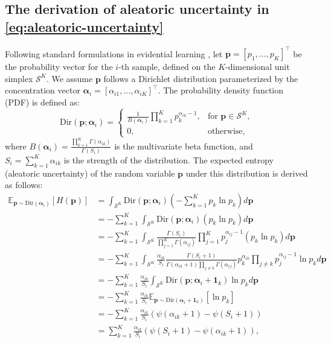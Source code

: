 \subsection{The derivation of aleatoric uncertainty in \cref{eq:aleatoric-uncertainty}}
\label{appendix:aleatoric-uncertainty}
Following standard formulations in evidential learning \citep{rule, r-edl}, let $\mathbf{p} = [p_1, \dots, p_K]^\top$ be the probability vector for the $i$-th sample, defined on the $K$-dimensional unit simplex $\mathcal{S}^K$. We assume $\mathbf{p}$ follows a Dirichlet distribution parameterized by the concentration vector $\boldsymbol{\alpha}_i = [\alpha_{i1}, \dots, \alpha_{iK}]^\top$. The probability density function (PDF) is defined as:
\begin{equation}
    \text{Dir}(\mathbf{p}; \boldsymbol{\alpha}_i) = 
    \begin{cases} 
        \displaystyle\frac{1}{B(\boldsymbol{\alpha}_i)} \prod_{k=1}^{K} p_k^{\alpha_{ik}-1}, & \text{for } \mathbf{p} \in \mathcal{S}^K, \\
        0, & \text{otherwise},
    \end{cases}
    \label{eq:dirichlet_pdf}
\end{equation}
where $B(\boldsymbol{\alpha}_i) = \frac{\prod_{k=1}^K \Gamma(\alpha_{ik})}{\Gamma(S_i)}$ is the multivariate beta function, and $S_i = \sum_{k=1}^K \alpha_{ik}$ is the strength of the distribution. The expected entropy (aleatoric uncertainty) of the random variable $\mathbf{p}$ under this distribution is derived as follows:
\begin{equation}
\begin{split}
\mathbb{E}_{\mathbf{p} \sim \text{Dir}(\boldsymbol{\alpha}_i)} [H(\mathbf{p})] 
    &= \int_{\mathcal{S}^K} \text{Dir}(\mathbf{p}; \boldsymbol{\alpha}_i) \left( - \sum_{k=1}^{K} p_k \ln p_k \right) d\mathbf{p} \nonumber \\
    &= - \sum_{k=1}^{K} \int_{\mathcal{S}^K} \text{Dir}(\mathbf{p}; \boldsymbol{\alpha}_i) (p_k \ln p_k) d\mathbf{p} \nonumber \\
    &= - \sum_{k=1}^{K} \int_{\mathcal{S}^K} \frac{\Gamma(S_i)}{\prod_{j=1}^{K} \Gamma(\alpha_{ij})} \prod_{j=1}^{K} p_j^{\alpha_{ij}-1} (p_k \ln p_k) d\mathbf{p} \nonumber \\
    &= - \sum_{k=1}^{K} \int_{\mathcal{S}^K} \frac{\alpha_{ik}}{S_i} \frac{\Gamma(S_i + 1)}{\Gamma(\alpha_{ik} + 1) \prod_{j \neq k} \Gamma(\alpha_{ij})} p_k^{\alpha_{ik}} \prod_{j \neq k} p_j^{\alpha_{ij}-1} \ln p_k d\mathbf{p} \nonumber \\
    &= - \sum_{k=1}^{K} \frac{\alpha_{ik}}{S_i} \int_{\mathcal{S}^K} \text{Dir}(\mathbf{p}; \boldsymbol{\alpha}_i + \mathbf{1}_k) \ln p_k d\mathbf{p} \nonumber \\
    &= - \sum_{k=1}^{K} \frac{\alpha_{ik}}{S_i} \mathbb{E}_{\mathbf{p} \sim \text{Dir}(\boldsymbol{\alpha}_i + \mathbf{1}_k)} [\ln p_k] \nonumber \\
    &= - \sum_{k=1}^{K} \frac{\alpha_{ik}}{S_i} (\psi(\alpha_{ik} + 1) - \psi(S_i + 1)) \nonumber \\
    &= \sum_{k=1}^{K} \frac{\alpha_{ik}}{S_i} (\psi(S_i + 1) - \psi(\alpha_{ik} + 1)),
\end{split}
\end{equation}
